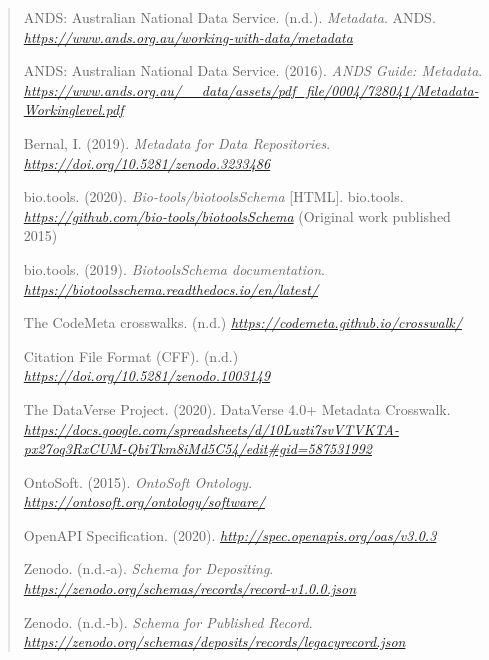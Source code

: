 \documentclass[]{article}
\begin{document}
\begin{quote}
ANDS: Australian National Data Service. (n.d.). \emph{Metadata}. ANDS.
\href{https://www.ands.org.au/working-with-data/metadata}{\emph{https://www.ands.org.au/working-with-data/metadata}}

ANDS: Australian National Data Service. (2016). \emph{ANDS Guide:
Metadata}.
\href{https://www.ands.org.au/__data/assets/pdf_file/0004/728041/Metadata-Workinglevel.pdf}{\emph{https://www.ands.org.au/\_\_data/assets/pdf\_file/0004/728041/Metadata-Workinglevel.pdf}}

Bernal, I. (2019). \emph{Metadata for Data Repositories}.
\href{https://doi.org/10.5281/zenodo.3233486}{\emph{https://doi.org/10.5281/zenodo.3233486}}

bio.tools. (2020). \emph{Bio-tools/biotoolsSchema} {[}HTML{]}.
bio.tools.
\href{https://github.com/bio-tools/biotoolsSchema}{\emph{https://github.com/bio-tools/biotoolsSchema}}
(Original work published 2015)

bio.tools. (2019). \emph{BiotoolsSchema documentation}.
\href{https://biotoolsschema.readthedocs.io/en/latest/}{\emph{https://biotoolsschema.readthedocs.io/en/latest/}}

The CodeMeta crosswalks. (n.d.)
\href{https://codemeta.github.io/crosswalk/}{\emph{https://codemeta.github.io/crosswalk/}}

Citation File Format (CFF). (n.d.)
\href{https://doi.org/10.5281/zenodo.1003149}{\emph{https://doi.org/10.5281/zenodo.1003149}}

The DataVerse Project. (2020). DataVerse 4.0+ Metadata Crosswalk.
\href{https://docs.google.com/spreadsheets/d/10Luzti7svVTVKTA-px27oq3RxCUM-QbiTkm8iMd5C54/edit\#gid=587531992}{\emph{https://docs.google.com/spreadsheets/d/10Luzti7svVTVKTA-px27oq3RxCUM-QbiTkm8iMd5C54/edit\#gid=587531992}}

OntoSoft. (2015). \emph{OntoSoft Ontology}.
\href{https://ontosoft.org/ontology/software/}{\emph{https://ontosoft.org/ontology/software/}}

OpenAPI Specification. (2020).
\href{http://spec.openapis.org/oas/v3.0.3}{\emph{http://spec.openapis.org/oas/v3.0.3}}

Zenodo. (n.d.-a). \emph{Schema for Depositing}.
\href{https://zenodo.org/schemas/records/record-v1.0.0.json}{\emph{https://zenodo.org/schemas/records/record-v1.0.0.json}}

Zenodo. (n.d.-b). \emph{Schema for Published Record}.
\href{https://zenodo.org/schemas/deposits/records/legacyrecord.json}{\emph{https://zenodo.org/schemas/deposits/records/legacyrecord.json}}
\end{quote}
\end{document}
